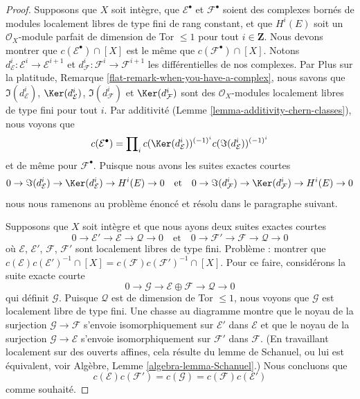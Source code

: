 \begin{proof}
\medskip\noindent
Supposons que $X$ soit intègre, que $\mathcal{E}^\bullet$ et $\mathcal{F}^\bullet$
soient des complexes bornés de modules localement libres de type fini de rang constant, et que
$H^i(E)$ soit un $\mathcal{O}_X$-module parfait de dimension de Tor $\leq 1$
pour tout $i \in \mathbf{Z}$. Nous devons
montrer que $c(\mathcal{E}^\bullet) \cap [X]$ est le même que
$c(\mathcal{F}^\bullet) \cap [X]$. Notons
$d_\mathcal{E}^i : \mathcal{E}^i \to \mathcal{E}^{i + 1}$ et
$d_\mathcal{F}^i : \mathcal{F}^i \to \mathcal{F}^{i + 1}$
les différentielles de nos complexes. Par
Plus sur la platitude, Remarque \ref{flat-remark-when-you-have-a-complex},
nous savons que $\Im(d_\mathcal{E}^i)$, $\Ker(d_\mathcal{E}^i)$,
$\Im(d_\mathcal{F}^i)$ et $\Ker(d_\mathcal{F}^i)$
sont des $\mathcal{O}_X$-modules localement libres de type fini pour tout $i$.
Par additivité (Lemme \ref{lemma-additivity-chern-classes}), nous voyons que
$$
c(\mathcal{E}^\bullet) = \prod\nolimits_i
c(\Ker(d_\mathcal{E}^i))^{(-1)^i} c(\Im(d_\mathcal{E}^i))^{(-1)^i}
$$
et de même pour $\mathcal{F}^\bullet$. Puisque nous avons les
suites exactes courtes
$$
0 \to \Im(d_\mathcal{E}^i) \to \Ker(d_\mathcal{E}^i) \to H^i(E) \to 0
\quad\text{et}\quad
0 \to \Im(d_\mathcal{F}^i) \to \Ker(d_\mathcal{F}^i) \to H^i(E) \to 0
$$
nous nous ramenons au problème énoncé et résolu dans le paragraphe suivant.

\medskip\noindent
Supposons que $X$ soit intègre et que nous ayons deux suites exactes courtes
$$
0 \to \mathcal{E}' \to \mathcal{E} \to \mathcal{Q} \to 0
\quad\text{et}\quad
0 \to \mathcal{F}' \to \mathcal{F} \to \mathcal{Q} \to 0
$$
où $\mathcal{E}$, $\mathcal{E}'$, $\mathcal{F}$, $\mathcal{F}'$ sont
localement libres de type fini. Problème : montrer que
$c(\mathcal{E})c(\mathcal{E}')^{-1} \cap [X] =
c(\mathcal{F})c(\mathcal{F}')^{-1} \cap [X]$.
Pour ce faire, considérons la suite exacte courte
$$
0 \to \mathcal{G} \to \mathcal{E} \oplus \mathcal{F} \to \mathcal{Q} \to 0
$$
qui définit $\mathcal{G}$. Puisque $\mathcal{Q}$ est de dimension de Tor $\leq 1$,
nous voyons que $\mathcal{G}$ est localement libre de type fini. Une chasse au diagramme
montre que le noyau de la surjection $\mathcal{G} \to \mathcal{F}$
s'envoie isomorphiquement sur $\mathcal{E}'$ dans $\mathcal{E}$ et
que le noyau de la surjection $\mathcal{G} \to \mathcal{E}$ s'envoie
isomorphiquement sur $\mathcal{F}'$ dans $\mathcal{F}$. (En travaillant localement
sur des ouverts affines, cela résulte du lemme de Schanuel, ou lui est équivalent, voir
Algèbre, Lemme \ref{algebra-lemma-Schanuel}.)
Nous concluons que
$$
c(\mathcal{E})c(\mathcal{F}') = c(\mathcal{G}) =
c(\mathcal{F})c(\mathcal{E}')
$$
comme souhaité.
\end{proof}

